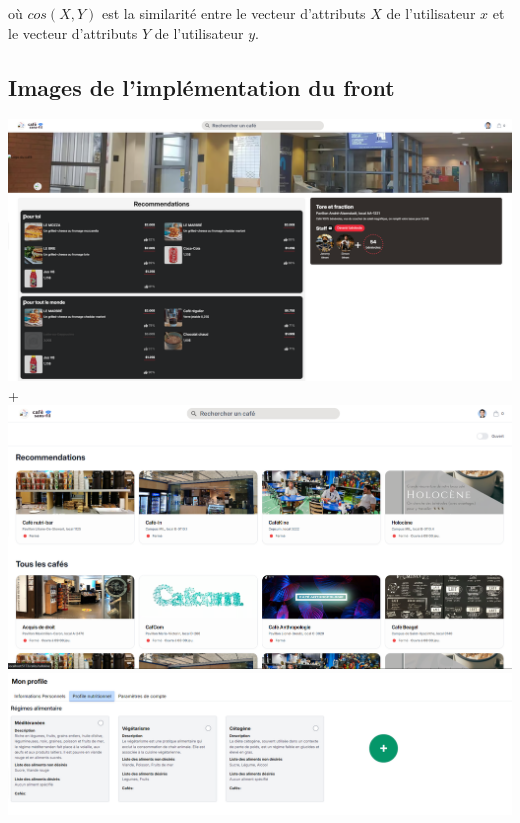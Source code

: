 \documentclass[11pt]{article}
\begin{document}
où $cos(X, Y)$ est la similarité entre le vecteur d'attributs $X$ de l'utilisateur $x$ et le vecteur d'attributs $Y$ de l'utilisateur $y$.


\newpage

\newpage
\subsection{Images de l'implémentation du front}
\label{images}

\includegraphics[scale=0.3]{images/recommendation_personnalises.png}+ \\

\includegraphics[scale=0.3]{images/recommendation_cafe.png} \\

\includegraphics[scale=0.4]{images/diet_profile.png} \\
\end{document}
